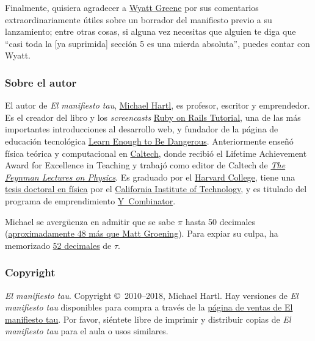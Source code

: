 Finalmente, quisiera agradecer a \href{http://techiferous.com/about}{Wyatt Greene} por sus comentarios extraordinariamente útiles sobre un borrador del manifiesto previo a su lanzamiento; entre otras cosas, si alguna vez necesitas que alguien te diga que ``casi toda la [ya suprimida] sección 5 es una mierda absoluta'', puedes contar con Wyatt.



    \subsubsection{Sobre el autor} %
    \label{sec:about_the_author}


El autor de \emph{El manifiesto tau}, \href{http://www.michaelhartl.com/}{Michael Hartl}, es  profesor, escritor y emprendedor. Es el creador del libro y los \textit{screencasts}
\href{http://www.railstutorial.org/}{Ruby on Rails Tutorial}, una de las más importantes introducciones al desarrollo web, y fundador de la página de educación tecnológica \href{http://learnenough.com/}{Learn Enough to Be Dangerous}. Anteriormente enseñó física teórica y computacional en \href{http://www.caltech.edu/}{Caltech}, donde recibió el Lifetime Achievement Award for Excellence in Teaching y trabajó como editor de Caltech de \href{http://www.feynmanlectures.caltech.edu/}{\emph{The Feynman Lectures on Physics}}. Es graduado por el \href{http://college.harvard.edu/}{Harvard College}, tiene una \href{http://thesis.library.caltech.edu/1940/}{tesis doctoral en física} por el \href{http://www.caltech.edu/}{California Institute of Technology}, y es titulado del programa de emprendimiento \href{http://ycombinator.com/}{Y~Combinator}.

Michael se avergüenza en admitir que se sabe $\pi$ hasta 50 decimales (\href{\#fig-futurama_video}{aproximadamente 48 más que Matt Groening}). Para expiar su culpa, ha memorizado \href{http://www.wolframalpha.com/input/?i=N[2+Pi,+53]}{52 decimales} de $\tau$.

    \subsubsection{Copyright} %
    \label{sec:copyright_and_license}

    \emph{El manifiesto tau}. Copyright \copyright\ 2010--2018, Michael Hartl. Hay versiones de \emph{El manifiesto tau} disponibles para compra a través de la \href{http://sales.tauday.com/}{página de ventas de El manifiesto tau}. Por favor, siéntete libre de imprimir y distribuir copias de \emph{El manifiesto tau} para el aula o usos similares.

